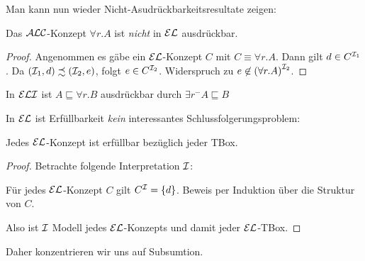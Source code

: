 Man kann nun wieder Nicht-Asudrückbarkeitsresultate zeigen:
\begin{lemma}
    Das $\mathcal{A}\mathcal{L}\mathcal{C}$-Konzept $\forall r.A$ ist \emph{nicht} in $\mathcal{E}\mathcal{L}$ ausdrückbar.
\end{lemma}
\begin{tafel}[continues=t:63]
    \begin{proof}
        Angenommen es gäbe ein $\mathcal{E}\mathcal{L}$-Konzept $C$ mit $C \equiv \forall r.A$.
        Dann gilt $d \in C^{\mathcal{I}_1}$. Da $(\mathcal{I}_1, d) \precsim (\mathcal{I}_2, e)$,
        folgt $e \in C^{\mathcal{I}_2}$. Widerspruch zu $e \not\in {(\forall
        r.A)}^{\mathcal{I}_2}$.
    \end{proof}
    In $\mathcal{E}\mathcal{L}\mathcal{I}$ ist $A \sqsubseteq \forall r.B$ ausdrückbar durch $\exists r^- A \sqsubseteq B$
\end{tafel}

In $\mathcal{E}\mathcal{L}$ ist Erfüllbarkeit \emph{kein} interessantes Schlussfolgerungsproblem:

\begin{lemma}
    Jedes $\mathcal{E}\mathcal{L}$-Konzept ist erfüllbar bezüglich jeder TBox.
\end{lemma}

\begin{tafel}\mbox{}
    \begin{proof}
    Betrachte folgende Interpretation $\mathcal{I}$:

\begin{center}
    \end{center}

Für jedes $\mathcal{E}\mathcal{L}$-Konzept $C$ gilt $C^{\mathcal{I}} = \{d\}$. Beweis per Induktion über
die Struktur von $C$.

Also ist $\mathcal{I}$ Modell jedes $\mathcal{E}\mathcal{L}$-Konzepts und damit jeder $\mathcal{E}\mathcal{L}$-TBox.
\end{proof}
\end{tafel}

Daher konzentrieren wir uns auf Subsumtion.

